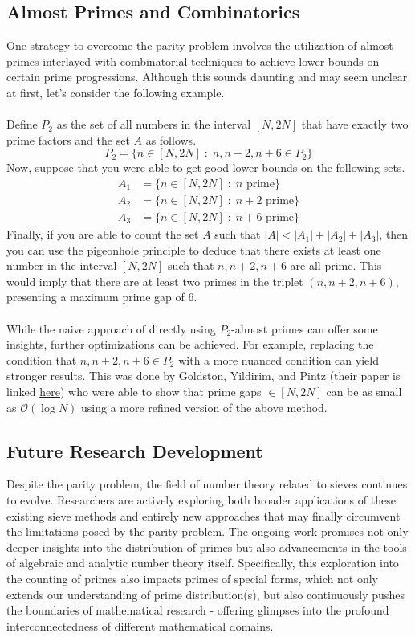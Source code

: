 \subsection{Almost Primes and Combinatorics}
One strategy to overcome the parity problem involves the utilization of almost primes interlayed with combinatorial techniques to achieve lower bounds on certain prime progressions.
Although this sounds daunting and may seem unclear at first, let's consider the following example.\\
\\
Define $P_2$ as the set of all numbers in the interval $[N,2N]$ that have exactly two prime factors and the set $A$ as follows.
$$
P_2 = \{n \in [N,2N] \;:\; n, n+2, n+6 \in P_2\}
$$
Now, suppose that you were able to get good lower bounds on the following sets.
\begin{align*}
  A_1 &= \{n \in [N,2N] \;:\; n \text{ prime}\}\\
  A_2 &= \{n \in [N,2N] \;:\; n+2 \text{ prime}\}\\
  A_3 &= \{n \in [N,2N] \;:\; n+6 \text{ prime}\}
\end{align*}
Finally, if you are able to count the set $A$ such that $|A| < |A_1| + |A_2| + |A_3|$, then you can use the pigeonhole principle to deduce that there exists at least one number in the interval $[N,2N]$ such that $n, n+2, n+6$ are all prime. This would imply that there are at least two primes in the triplet $(n,n+2,n+6)$, presenting a maximum prime gap of $6$.\\
\\
While the naive approach of directly using $P_2$-almost primes can offer some insights, further optimizations can be achieved. For example, replacing the condition that $n, n+2, n+6 \in P_2$ with a more nuanced condition can yield stronger results. 
This was done by Goldston, Yildirim, and Pintz (their paper is linked \href{https://terrytao.wordpress.com/2007/06/05/open-question-the-parity-problem-in-sieve-theory/}{here}) who were able to show that prime gaps $\in [N,2N]$ can be as small as $\mathcal{O}\left(\log N\right)$ using a more refined version of the above method. 



\subsection{Future Research Development}
Despite the parity problem, the field of number theory related to sieves continues to evolve. 
Researchers are actively exploring both broader applications of these existing sieve methods and entirely new approaches that may finally circumvent the limitations posed by the parity problem. 
The ongoing work promises not only deeper insights into the distribution of primes but also advancements in the tools of algebraic and analytic number theory itself.
Specifically, this exploration into the counting of primes also impacts primes of special forms, which not only extends our understanding of prime distribution(s), but also continuously pushes the boundaries of mathematical research - offering glimpses into the profound interconnectedness of different mathematical domains.



